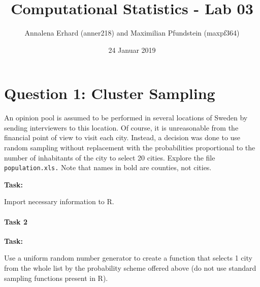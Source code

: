 \documentclass[]{article}
\title{Computational Statistics - Lab 03}
\author{Annalena Erhard (anner218) and Maximilian Pfundstein (maxpf364)}
\date{24 Januar 2019}
\newenvironment{Shaded}{\begin{snugshade}}{\end{snugshade}}
\newcommand{\KeywordTok}[1]{\textcolor[rgb]{0.13,0.29,0.53}{\textbf{#1}}}
\newcommand{\DataTypeTok}[1]{\textcolor[rgb]{0.13,0.29,0.53}{#1}}
\newcommand{\DecValTok}[1]{\textcolor[rgb]{0.00,0.00,0.81}{#1}}
\newcommand{\StringTok}[1]{\textcolor[rgb]{0.31,0.60,0.02}{#1}}
\newcommand{\ControlFlowTok}[1]{\textcolor[rgb]{0.13,0.29,0.53}{\textbf{#1}}}
\newcommand{\OperatorTok}[1]{\textcolor[rgb]{0.81,0.36,0.00}{\textbf{#1}}}
\newcommand{\NormalTok}[1]{#1}
\let\oldparagraph\paragraph
\renewcommand{\paragraph}[1]{\oldparagraph{#1}\mbox{}}
\begin{document}
\maketitle

{
\setcounter{tocdepth}{3}
\tableofcontents
}
\section{Question 1: Cluster
Sampling}\label{question-1-cluster-sampling}

An opinion pool is assumed to be performed in several locations of
Sweden by sending interviewers to this location. Of course, it is
unreasonable from the ﬁnancial point of view to visit each city.
Instead, a decision was done to use random sampling without replacement
with the probabilities proportional to the number of inhabitants of the
city to select 20 cities. Explore the ﬁle \texttt{population.xls.} Note
that names in bold are counties, not cities.

\textbf{Task:}

Import necessary information to R.

\paragraph{Task 2}\label{task-2}

\textbf{Task:}

Use a uniform random number generator to create a function that selects
1 city from the whole list by the probability scheme oﬀered above (do
not use standard sampling functions present in R).

\begin{Shaded}
\end{Shaded}
\end{document}
